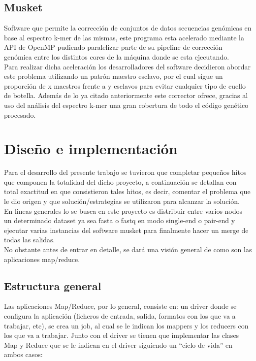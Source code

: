 \documentclass[conference]{IEEEtran}
\begin{document}
\subsection{Musket}
Software que permite la corrección de conjuntos de datos secuencias genómicas en base al espectro k-mer de las mismas, este programa esta acelerado mediante la API de OpenMP pudiendo paralelizar parte de su pipeline de corrección genómica entre los distintos cores de la máquina donde se esta ejecutando.\\
Para realizar dicha aceleración los desarrolladores del software decidieron abordar este problema utilizando un patrón maestro esclavo, por el cual sigue un proporción de x maestros frente a y esclavos para evitar cualquier tipo de cuello de botella. Además de lo ya citado anteriormente este corrector ofrece, gracias al uso del análisis del espectro k-mer una gran cobertura de todo el código genético procesado.

\section{Diseño e implementación}

Para el desarrollo del presente trabajo se tuvieron que completar pequeños hitos que componen la totalidad del dicho proyecto, a continuación se detallan con total exactitud en que consistieron tales hitos, es decir, comentar el problema que le dio origen y que solución/estrategias se utilizaron para alcanzar la solución.\\

En lineas generales lo se busca en este proyecto es distribuir entre varios nodos un determinado dataset ya sea fasta o fastq en modo single-end o pair-end y ejecutar varias instancias del software musket para finalmente hacer un merge de todas las salidas.\\

No obstante antes de entrar en detalle, se dará una visión general de como son las aplicaciones map/reduce.

\subsection{Estructura general}
Las aplicaciones Map/Reduce, por lo general, consiste en: un driver donde se configura la aplicación (ficheros de entrada, salida, formatos con los que va a trabajar, etc), se crea un job, al cual se le indican los mappers y los reducers con los que va a trabajar. Junto con el driver se tienen que implementar las clases Map y Reduce que se le indican en el driver siguiendo un ``ciclo de vida'' en ambos casos:
\end{document}
